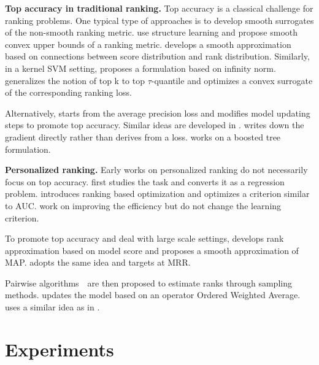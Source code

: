 \documentclass[letterpaper]{article} %
\begin{document}
\textbf{Top accuracy in traditional ranking.} Top accuracy is a classical challenge for ranking problems. %
One typical type of approaches is to develop smooth surrogates of the non-smooth ranking metric.\cite{weimer2008cofi} use structure learning and propose smooth convex upper bounds of a ranking metric. \cite{taylor2008softrank} develops a smooth approximation based on connections between score distribution and rank distribution. Similarly, in a kernel SVM setting, \cite{agarwal2011infinite} proposes a formulation based on infinity norm. \cite{boyd2012accuracy} generalizes the notion of top k to top $\tau$-quantile and optimizes a convex surrogate of the corresponding ranking loss.

Alternatively, \cite{burges2005learning} starts from the average precision loss and modifies model updating steps to promote top accuracy. Similar ideas are developed in \cite{burges2007learning,wu2010adapting}. \cite{burges2007learning} writes down the gradient directly rather than derives from a loss. \cite{wu2010adapting} works on a boosted tree formulation.

\noindent\textbf{Personalized ranking.} Early works on personalized ranking do not necessarily focus on top accuracy. \cite{hu2008collaborative} first studies the task and converts it as a regression problem. \cite{rendle2009bpr} introduces ranking based optimization and optimizes a criterion similar to AUC. \cite{rendle2014improving} work on improving the efficiency but do not change the learning criterion.

To promote top accuracy and deal with large scale settings, \cite{shi2012tfmap} develops rank approximation based on model score and proposes a smooth approximation of MAP. \cite{shi2012climf} adopts the same idea and targets at MRR.

Pairwise algorithms~\cite{weston2010large,yuan2016lambdafm}~are then proposed to estimate ranks through sampling methods. \cite{weston2010large} updates the model based on an operator Ordered Weighted Average. \cite{yuan2016lambdafm} uses a similar idea as in \cite{burges2005learning}.

\section{Experiments}
\label{sec:exp}
\end{document}
